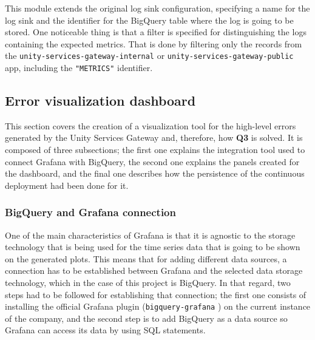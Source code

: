 \documentclass[english, 12pt, a4paper, sci, utf8, a-1b, online]{aaltothesis}
\begin{document}
This module extends the original log sink configuration, specifying a name for the log sink and the identifier for the BigQuery table where the log is going to be stored. One noticeable thing is that a filter is specified for distinguishing the logs containing the expected metrics. That is done by filtering only the records from the \texttt{unity-services-gateway-internal} or \texttt{unity-services-gateway-public} app, including the \texttt{"METRICS"} identifier.

\subsection{Error visualization dashboard}
\label{sec:visualization-dashboard}



This section covers the creation of a visualization tool for the high-level errors generated by the Unity Services Gateway and, therefore, how \textbf{Q3} is solved. It is composed of three subsections; the first one explains the integration tool used to connect Grafana with BigQuery, the second one explains the panels created for the dashboard, and the final one describes how the persistence of the continuous deployment had been done for it.

\subsubsection{BigQuery and Grafana connection}

One of the main characteristics of Grafana is that it is agnostic to the storage technology that is being used for the time series data that is going to be shown on the generated plots. This means that for adding different data sources, a connection has to be established between Grafana and the selected data storage technology, which in the case of this project is BigQuery. In that regard, two steps had to be followed for establishing that connection; the first one consists of installing the official Grafana plugin (\texttt{bigquery-grafana} \cite{GrafanaPlugin}) on the current instance of the company, and the second step is to add BigQuery as a data source so Grafana can access its data by using SQL statements.\\
\end{document}
